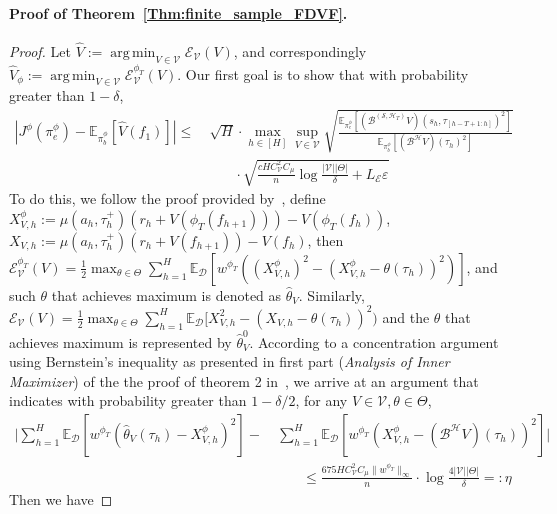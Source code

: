 \documentclass[twoside]{article}
\DeclareMathOperator*{\argmin}{arg\,min}
\newcommand{\CAL}[1]{\mathcal{#1}}
\begin{document}
\paragraph{Proof of Theorem~\ref{Thm:finite_sample_FDVF}.}
\begin{proof}
    Let $\hat{V}:=\argmin_{V\in\CAL{V}}\CAL{E}_{\CAL{V}}(V)$, and correspondingly $\hat{V}_{\phi}:=\argmin_{V\in\CAL{V}}\CAL{E}_{\CAL{V}}^{\phi_T}(V)$. Our first goal is to show that with probability greater than $1-\delta$,
    \begin{align}
        |J^\phi(\pi_e^\phi)-\mathbb{E}_{\pi_b^\phi}[\hat{V}(f_1)]|\leq&\  \sqrt{H} \cdot \max_{h\in[H]}\sup_{V\in\CAL{V}}\sqrt{\frac{\mathbb{E}_{\pi_e^\phi}[(\CAL{B}^{(\CAL{S},\CAL{H}_T)}V)(s_h,\tau_{[h-T+1:h]})^2]}{\mathbb{E}_{\pi_b^\phi}[(\CAL{B^H}V)(\tau_h)^2]}}\nonumber\\&\qquad\cdot\sqrt{\frac{cHC_{\CAL{V}}^2C_\mu}{n}\log\frac{|\CAL{V}||{\Theta}|}{\delta}+L_{\CAL{E}}\varepsilon} \label{inequ:fdvf_proof_-1}
    \end{align}
To do this, we follow the proof provided by~\cite{zhang2024cursesfuturehistoryfuturedependent}, define
$X_{V,h}^{\phi}:=\mu(a_h,\tau_h^+)(r_h+V(\phi_T(f_{h+1})))-V(\phi_T({f_h}))$, $X_{V,h}:=\mu(a_h,\tau_h^+)(r_h+V(f_{h+1}))-V(f_h)$, then $\CAL{E}_{\CAL{V}}^{\phi_T}(V)=\frac{1}{2}\max_{\theta\in\Theta}\sum_{h=1}^H\mathbb{E}_{\CAL{D}}[w^{\phi_T}((X_{V,h}^\phi)^2-(X_{V,h}^\phi-\theta(\tau_h))^2)]$, and such $\theta$ that achieves maximum is denoted as $\hat{\theta}_{V}$. Similarly, $\CAL{E}_{\CAL{V}}(V)=\frac{1}{2}\max_{\theta\in\Theta}\sum_{h=1}^H\mathbb{E}_{\CAL{D}}[X_{V,h}^2-(X_{V,h}-\theta(\tau_h))^2)$ and the $\theta$ that achieves maximum is represented by $\hat{\theta}^{0}_V$. According to a concentration argument using Bernstein’s inequality as presented in first part (\textit{Analysis of Inner Maximizer}) of the the proof of theorem 2 in~\cite{zhang2024cursesfuturehistoryfuturedependent}, we arrive at an argument that indicates with probability greater than $1-\delta/2$, for any $V\in\CAL{V},\theta\in\Theta$,
\begin{align}
    \bigg|
    \sum_{h=1}^H\mathbb{E}_{\CAL{D}}[w^{\phi_T}(\hat{\theta}_V(\tau_h)-X_{V,h}^\phi)^2]-&\ \sum_{h=1}^H\mathbb{E}_{\CAL{D}}[w^{\phi_T}(X_{V,h}^\phi-(\CAL{B^H}V)(\tau_h))^2]
    \bigg|\nonumber\\&\qquad\leq \frac{675HC_{\CAL{V}}^2C_\mu\|w^{\phi_T}\|_\infty}{n}\cdot\log\frac{4|\CAL{V}||\Theta|}{\delta}=:\eta\label{inequ:fdvf_proof_0}
\end{align}
Then we have

\end{proof}
\end{document}
